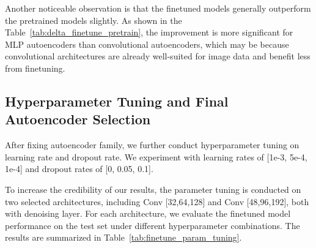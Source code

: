 \documentclass[10pt,letterpaper]{article}
\begin{document}
Another noticeable observation is that the finetuned models generally outperform the pretrained models slightly. As shown in the Table~\ref{tab:delta_finetune_pretrain}, the improvement is more significant for MLP autoencoders than convolutional autoencoders, which may be because convolutional architectures are already well-suited for image data and benefit less from finetuning.


\subsection{Hyperparameter Tuning and Final Autoencoder Selection}

After fixing autoencoder family, we further conduct hyperparameter tuning on learning rate and dropout rate. We experiment with learning rates of [1e-3, 5e-4, 1e-4] and dropout rates of [0, 0.05, 0.1].

To increase the credibility of our results, the parameter tuning is conducted on two selected architectures, including Conv [32,64,128] and Conv [48,96,192], both with denoising layer. For each architecture, we evaluate the finetuned model performance on the test set under different hyperparameter combinations. The results are summarized in Table~\ref{tab:finetune_param_tuning}.
\end{document}

